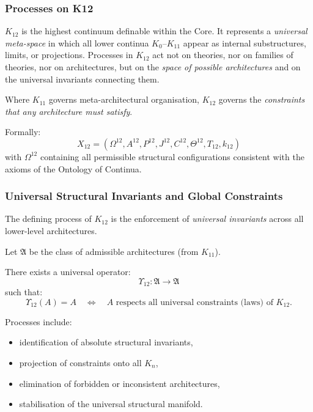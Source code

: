 

\subsubsection{Processes on K12}
\label{sec:processes-k12}

$K_{12}$ is the highest continuum definable within the Core.
It represents a \emph{universal meta-space} in which all lower continua
$K_0$--$K_{11}$ appear as internal substructures, limits, or projections.
Processes in $K_{12}$ act not on theories, nor on families of theories,
nor on architectures, but on the \emph{space of possible architectures}
and on the universal invariants connecting them.

Where $K_{11}$ governs meta-architectural organisation,
$K_{12}$ governs the \emph{constraints that any architecture must satisfy}.

Formally:
\[
X_{12} = (\Omega^{12}, A^{12}, P^{12}, J^{12},
          C^{12}, \Theta^{12}, T_{12}, k_{12})
\]
with $\Omega^{12}$ containing all permissible structural configurations
consistent with the axioms of the Ontology of Continua.

\subsubsection{Universal Structural Invariants and Global Constraints}

The defining process of $K_{12}$ is the enforcement of
\emph{universal invariants} across all lower-level architectures.

Let $\mathfrak{A}$ be the class of admissible architectures
(from $K_{11}$).

There exists a universal operator:
\[
\Upsilon_{12} : \mathfrak{A} \to \mathfrak{A}
\]
such that:
\[
\Upsilon_{12}(A) = A
\quad \Longleftrightarrow \quad
A \text{ respects all universal constraints (laws) of } K_{12}.
\]

Processes include:
\begin{itemize}
    \item identification of absolute structural invariants,
    \item projection of constraints onto all $K_n$,
    \item elimination of forbidden or inconsistent architectures,
    \item stabilisation of the universal structural manifold.
\end{itemize}

